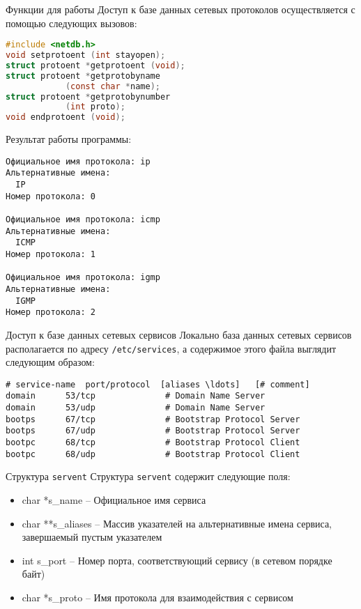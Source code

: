 \begin{frame}[fragile]{Функции для работы}
Доступ к базе данных сетевых протоколов осуществляется с помощью следующих вызовов:
\scriptsize\begin{lstlisting}[language=C]
#include <netdb.h>
void setprotoent (int stayopen);
struct protoent *getprotoent (void);
struct protoent *getprotobyname 
            (const char *name);
struct protoent *getprotobynumber
			(int proto);
void endprotoent (void);
\end{lstlisting}
\end{frame}

\begin{frame}[fragile]
\tiny
\end{frame}

\begin{frame}[fragile]{}
Результат работы программы:
\scriptsize\begin{verbatim}
Официальное имя протокола: ip
Альтернативные имена:
  IP
Номер протокола: 0

Официальное имя протокола: icmp
Альтернативные имена:
  ICMP
Номер протокола: 1

Официальное имя протокола: igmp
Альтернативные имена:
  IGMP
Номер протокола: 2
\end{verbatim}
\normalsize
\end{frame}

\begin{frame}[fragile]{Доступ к базе данных сетевых сервисов}
Локально база данных сетевых сервисов располагается по адресу {\tt /etc/services}, а содержимое этого файла выглядит следующим образом:
\scriptsize\begin{verbatim}
# service-name  port/protocol  [aliases \ldots]   [# comment]
domain		53/tcp				# Domain Name Server
domain		53/udp				# Domain Name Server
bootps		67/tcp				# Bootstrap Protocol Server
bootps		67/udp				# Bootstrap Protocol Server
bootpc		68/tcp				# Bootstrap Protocol Client
bootpc		68/udp				# Bootstrap Protocol Client
\end{verbatim}
\end{frame}

\begin{frame}{Структура {\tt servent}}
Структура {\tt servent} содержит следующие поля:
\begin{itemize}
	\item char  *s\_name -- Официальное имя сервиса
	\item char **s\_aliases -- Массив указателей на альтернативные имена сервиса, завершаемый пустым указателем
	\item int    s\_port -- Номер порта, соответствующий сервису (в сетевом порядке байт)
	\item char  *s\_proto -- Имя протокола для взаимодействия с сервисом
\end{itemize}
\end{frame}

